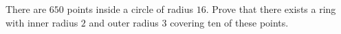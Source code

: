 There are $650$ points inside a circle of radius $16$. Prove that there exists a ring with inner radius $2$ and outer radius $3$ covering ten of these points.
